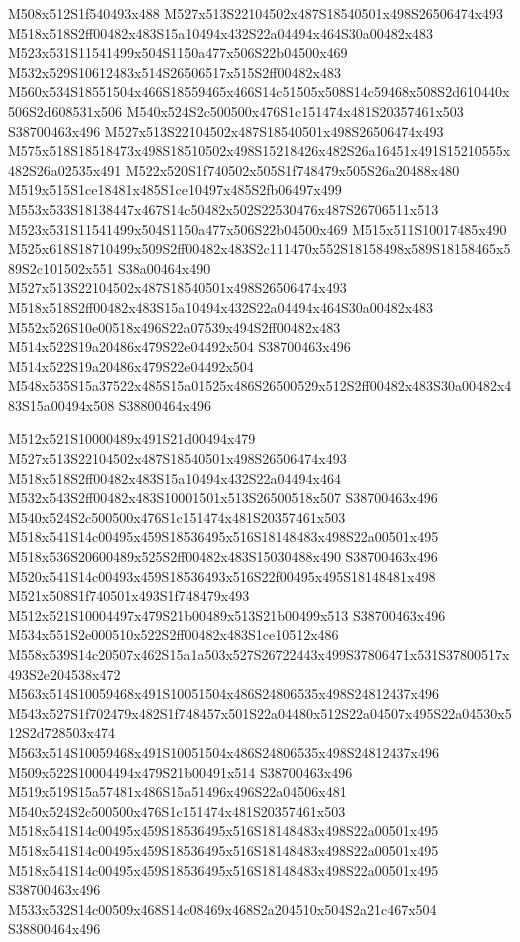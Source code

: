 \documentclass{article}
\begin{document}
\begin{multicols}{2}
M508x512S1f540493x488 M527x513S22104502x487S18540501x498S26506474x493 M518x518S2ff00482x483S15a10494x432S22a04494x464S30a00482x483 M523x531S11541499x504S1150a477x506S22b04500x469 M532x529S10612483x514S26506517x515S2ff00482x483 M560x534S18551504x466S18559465x466S14c51505x508S14c59468x508S2d610440x506S2d608531x506 M540x524S2c500500x476S1c151474x481S20357461x503 S38700463x496 M527x513S22104502x487S18540501x498S26506474x493 M575x518S18518473x498S18510502x498S15218426x482S26a16451x491S15210555x482S26a02535x491 M522x520S1f740502x505S1f748479x505S26a20488x480 M519x515S1ce18481x485S1ce10497x485S2fb06497x499 M553x533S18138447x467S14c50482x502S22530476x487S26706511x513 M523x531S11541499x504S1150a477x506S22b04500x469 M515x511S10017485x490 M525x618S18710499x509S2ff00482x483S2c111470x552S18158498x589S18158465x589S2c101502x551 S38a00464x490 M527x513S22104502x487S18540501x498S26506474x493 M518x518S2ff00482x483S15a10494x432S22a04494x464S30a00482x483 M552x526S10e00518x496S22a07539x494S2ff00482x483 M514x522S19a20486x479S22e04492x504 S38700463x496 M514x522S19a20486x479S22e04492x504 M548x535S15a37522x485S15a01525x486S26500529x512S2ff00482x483S30a00482x483S15a00494x508 S38800464x496

M512x521S10000489x491S21d00494x479 M527x513S22104502x487S18540501x498S26506474x493 M518x518S2ff00482x483S15a10494x432S22a04494x464 M532x543S2ff00482x483S10001501x513S26500518x507 S38700463x496 M540x524S2c500500x476S1c151474x481S20357461x503 M518x541S14c00495x459S18536495x516S18148483x498S22a00501x495 M518x536S20600489x525S2ff00482x483S15030488x490 S38700463x496 M520x541S14c00493x459S18536493x516S22f00495x495S18148481x498 M521x508S1f740501x493S1f748479x493 M512x521S10004497x479S21b00489x513S21b00499x513 S38700463x496 M534x551S2e000510x522S2ff00482x483S1ce10512x486 M558x539S14c20507x462S15a1a503x527S26722443x499S37806471x531S37800517x493S2e204538x472 M563x514S10059468x491S10051504x486S24806535x498S24812437x496 M543x527S1f702479x482S1f748457x501S22a04480x512S22a04507x495S22a04530x512S2d728503x474 M563x514S10059468x491S10051504x486S24806535x498S24812437x496 M509x522S10004494x479S21b00491x514 S38700463x496 M519x519S15a57481x486S15a51496x496S22a04506x481 M540x524S2c500500x476S1c151474x481S20357461x503 M518x541S14c00495x459S18536495x516S18148483x498S22a00501x495 M518x541S14c00495x459S18536495x516S18148483x498S22a00501x495 M518x541S14c00495x459S18536495x516S18148483x498S22a00501x495 S38700463x496 M533x532S14c00509x468S14c08469x468S2a204510x504S2a21c467x504 S38800464x496


\end{multicols}
\end{document}
